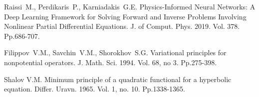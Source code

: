 \documentclass[12pt]{llncs}
\begin{document}
\begin{thebibliography}{9} %

 Raissi~M., Perdikaris~P., Karniadakis~G.E. Physics-Informed Neural Networks: A Deep Learning Framework for Solving Forward and Inverse Problems Involving Nonlinear Partial Differential Equations. J. of Comput. Phys. 2019. Vol. 378. Pp.686-707.

 Filippov~V.M., Savchin~V.M., Shorokhov~S.G. Variational principles for nonpotential operators. J. Math. Sci. 1994. Vol. 68, no 3. Pp.275-398.

 Shalov V.M.  Minimum principle of a quadratic functional for a hyperbolic equation. Differ. Uravn. 1965. Vol. 1, no. 10.  Pp.1338-1365.







\end{thebibliography}

\end{document}
